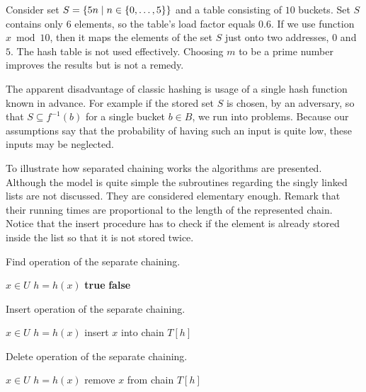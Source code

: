 \begin{example}
Consider set $S = \{5n \mid n \in \{0, \dots, 5\} \}$ and a table consisting of $10$ buckets. Set $S$ contains only 6 elements, so the table's load factor equals $0.6$. If we use function $x \bmod 10$, then it maps the elements of the set $S$ just onto two addresses, $0$ and $5$. The hash table is not used effectively. Choosing $m$ to be a prime number improves the results but is not a remedy.
\end{example}

The apparent disadvantage of classic hashing is usage of a single hash function known in advance. For example if  the stored set $S$ is chosen, by an adversary, so that $S \subseteq f^{-1}(b)$ for a single bucket $b \in B$, we run into problems. Because our assumptions say that the probability of having such an input is quite low, these inputs may be neglected.

To illustrate how separated chaining works the algorithms are presented. Although the model is quite simple the subroutines regarding the singly linked lists are not discussed. They are considered elementary enough. Remark that their running times are proportional to the length of the represented chain. Notice that the insert procedure has to check if the element is already stored inside the list so that it is not stored twice. 

\begin{algorithm}[ht]
\caption{Find operation of the separate chaining.}
\label{algorithm-find-separate-chaining}
\begin{algorithmic}
\REQUIRE $x \in U$
\STATE $h = h(x)$
\STATE
{}
	\RETURN \textbf{true} 
\ELSE
	\RETURN \textbf{false} 
\ENDIF
\end{algorithmic}
\end{algorithm}

\begin{algorithm}[ht]
\caption{Insert operation of the separate chaining.}
\label{algorithm-insert-separate-chaining}
\begin{algorithmic}
\REQUIRE $x \in U$
\STATE $h = h(x)$
\STATE
{}
	\STATE insert $x$ into chain $T[h]$
\ENDIF
\end{algorithmic}
\end{algorithm}

\begin{algorithm}[ht]
\caption{Delete operation of the separate chaining.}
\label{algorithm-delete-separate-chaining}
\begin{algorithmic}
\REQUIRE $x \in U$
\STATE $h = h(x)$
\STATE
{}
	\STATE remove $x$ from chain $T[h]$
\ENDIF
\end{algorithmic}
\end{algorithm}

